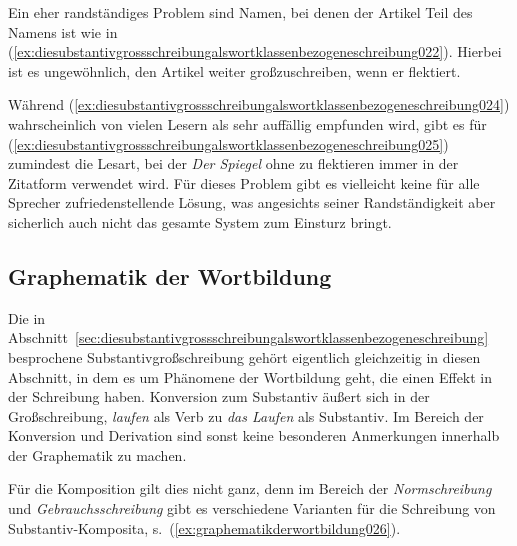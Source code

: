 Ein eher randständiges Problem sind Namen, bei denen der Artikel Teil des Namens ist wie in (\ref{ex:diesubstantivgrossschreibungalswortklassenbezogeneschreibung022}).
Hierbei ist es ungewöhnlich, den Artikel weiter großzuschreiben, wenn er flektiert.

\begin{exe}
  \ex\label{ex:diesubstantivgrossschreibungalswortklassenbezogeneschreibung023}
  \begin{xlist}
  \end{xlist}
\end{exe}

Während (\ref{ex:diesubstantivgrossschreibungalswortklassenbezogeneschreibung024}) wahrscheinlich von vielen Lesern als sehr auffällig empfunden wird, gibt es für (\ref{ex:diesubstantivgrossschreibungalswortklassenbezogeneschreibung025}) zumindest die Lesart, bei der \textit{Der Spiegel} ohne zu flektieren immer in der Zitatform verwendet wird.
Für dieses Problem gibt es vielleicht keine für alle Sprecher zufriedenstellende Lösung, was angesichts seiner Randständigkeit aber sicherlich auch nicht das gesamte System zum Einsturz bringt.

\subsection{Graphematik der Wortbildung}
\label{sec:graphematikderwortbildung}

Die in Abschnitt~\ref{sec:diesubstantivgrossschreibungalswortklassenbezogeneschreibung} besprochene Substantivgroßschreibung gehört eigentlich gleichzeitig in diesen Abschnitt, in dem es um Phänomene der Wortbildung geht, die einen Effekt in der Schreibung haben.
Konversion zum Substantiv äußert sich in der Großschreibung, \zB \textit{laufen} als Verb zu \textit{das Laufen} als Substantiv.
Im Bereich der Konversion und Derivation sind sonst keine besonderen Anmerkungen innerhalb der Graphematik zu machen.

Für die Komposition gilt dies nicht ganz, denn im Bereich der \textit{Normschreibung} und \textit{Gebrauchsschreibung} gibt es verschiedene Varianten für die Schreibung von Substantiv-Komposita, s.\ (\ref{ex:graphematikderwortbildung026}).
\begin{exe}
  \ex\label{ex:graphematikderwortbildung026}
  \begin{xlist}
  \end{xlist}
\end{exe}

